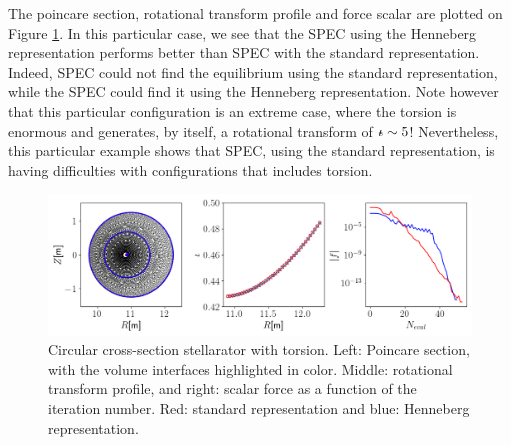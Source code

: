 \documentclass[my_thesis.tex]{subfiles}
\begin{document}
The poincare section, rotational transform profile and force scalar are plotted on Figure \ref{fig. circular stellarator henneberg represensation}. In this particular case, we see that the SPEC using the Henneberg representation performs better than SPEC with the standard representation. Indeed, SPEC could not find the equilibrium using the standard representation, while the SPEC could find it using the Henneberg representation. Note however that this particular configuration is an extreme case, where the torsion is enormous and generates, by itself, a rotational transform of $\text{$\iota\!\!$-}\sim 5$! Nevertheless, this particular example shows that SPEC, using the standard representation, is having difficulties with configurations that includes torsion. 

\begin{figure}
	\centering
	\includegraphics[width=\linewidth]{images/HennebergRepresentation/CircularTorsion.png}
	\caption{Circular cross-section stellarator with torsion. Left: Poincare section, with the volume interfaces highlighted in color. Middle: rotational transform profile, and right: scalar force as a function of the iteration number. Red: standard representation and blue: Henneberg representation.}
	\label{fig. circular stellarator henneberg represensation}
\end{figure}
\end{document}
